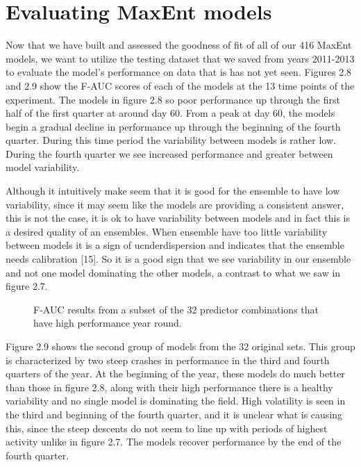 \section{Evaluating MaxEnt models}

Now that we have built and assessed the goodness of fit of all of our 416 MaxEnt models, we want to utilize the testing dataset that we saved from years 2011-2013 to evaluate the model's performance on data that is has not yet seen. Figures 2.8 and 2.9 show the F-AUC scores of each of the models at the 13 time points of the experiment. The models in figure 2.8 so poor performance up through the first half of the first quarter at around day 60. From a peak at day 60, the models begin a gradual decline in performance up through the beginning of the fourth quarter. During this time period the variability between models is rather low. During the fourth quarter we see increased performance and greater between model variability. \newline

\noindent Although it intuitively make seem that it is good for the ensemble to have low variability, since it may seem like the models are providing a consistent answer, this is not the case, it is ok to have variability between models and in fact this is a desired quality of an ensembles. When ensemble have too little variability between models it is a sign of ucnderdispersion and indicates that the ensemble needs calibration [15]. So it is a good sign that we see variability in our ensemble and not one model dominating the other models, a contrast to what we saw in figure 2.7. \newline


\begin{figure} [!ht]
\centerline{}
\caption{F-AUC results from a subset of the 32 predictor combinations that have high performance year round. }
\label{fig6}
\end{figure}

\noindent Figure 2.9 shows the second group of models from the 32 original sets. This group is characterized by two steep crashes in performance in the third and fourth quarters of the year. At the beginning of the year, these models do much better than those in figure 2.8, along with their high performance there is a healthy variability and no single model is dominating the field. High volatility is seen in the third and beginning of the fourth quarter, and it is unclear what is causing this, since the steep descents do not seem to line up with periods of highest activity unlike in figure 2.7.  The models recover performance by the end of the fourth quarter. \newline


